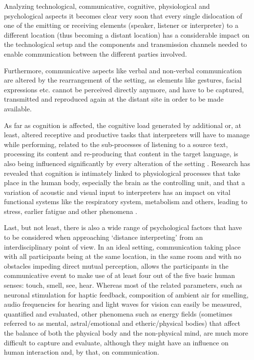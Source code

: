 \documentclass[output=paper]{langsci/langscibook}
\begin{document}
Analyzing technological, communicative, cognitive, physiological and psychological aspects it becomes clear very soon that every single dislocation of one of the emitting or receiving elements (speaker, listener or interpreter) to a different location (thus becoming a distant location) has a considerable impact on the technological setup and the components and transmission channels needed to enable communication between the different parties involved. 

Furthermore, communicative aspects like verbal and non-verbal communication are altered by the rearrangement of the setting, as elements like gestures, facial expressions etc. cannot be perceived directly anymore, and have to be captured, transmitted and reproduced again at the distant site in order to be made available.

As far as cognition is affected, the cognitive load generated by additional or, at least, altered receptive and productive tasks that interpreters will have to manage while performing, related to the sub-processes of listening to a source text, processing its content and re-producing that content in the target language, is also being influenced significantly by every alteration of the setting \citep{Moser-Mercer2005}. Research has revealed that cognition is intimately linked to physiological processes that take place in the human body, especially the brain as the controlling unit, and that a variation of acoustic and visual input to interpreters has an impact on vital functional systems like the respiratory system, metabolism and others, leading to stress, earlier fatigue and other phenomena \citep{Moser-Mercer2003}.

Last, but not least, there is also a wide range of psychological factors that have to be considered when approaching ‘distance interpreting’ from an interdisciplinary point of view. In an ideal setting, communication taking place with all participants being at the same location, in the same room and with no obstacles impeding direct mutual perception, allows the participants in the communicative event to make use of at least four out of the five basic human senses: touch, smell, see, hear. Whereas most of the related parameters, such as neuronal stimulation for haptic feedback, composition of ambient air for smelling, audio frequencies for hearing and light waves for vision can easily be measured, quantified and evaluated, other phenomena such as energy fields (sometimes referred to as mental, astral/emotional and etheric/physical bodies) that affect the balance of both the physical body and the non-physical mind, are much more difficult to capture and evaluate, although they might have an influence on human interaction and, by that, on communication.
\end{document}
